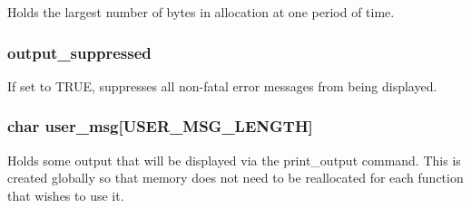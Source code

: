Holds the largest number of bytes in allocation at one period of time. 
\subsubsection{ output\_\-suppressed}\label{util_8c_a0}


If set to TRUE, suppresses all non-fatal error messages from being displayed. 
\subsubsection{\setlength{\rightskip}{0pt plus 5cm}char user\_\-msg[USER\_\-MSG\_\-LENGTH]}\label{util_8c_a4}


Holds some output that will be displayed via the print\_\-output command. This is created globally so that memory does not need to be reallocated for each function that wishes to use it. 